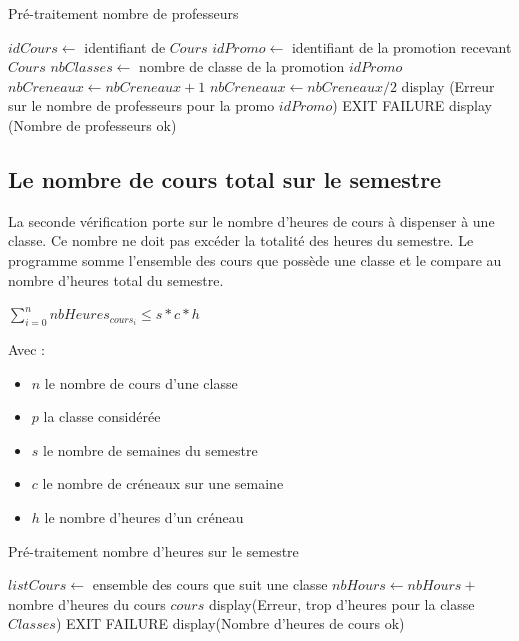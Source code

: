 \documentclass[12pt,a4paper,french]{article}
\begin{document}
\begin{algorithm}
\caption{Pré-traitement nombre de professeurs}
\begin{algorithmic}
\STATE $idCours \leftarrow$ identifiant de $Cours$
\STATE $idPromo \leftarrow$ identifiant de la promotion recevant $Cours$
\STATE $nbClasses \leftarrow$ nombre de classe de la promotion $idPromo$
\STATE $nbCreneaux \leftarrow nbCreneaux + 1$
\ENDIF
\ENDFOR
\ENDIF
\ENDFOR
{}
\STATE $nbCreneaux \leftarrow nbCreneaux / 2$
\ENDIF
{}
\STATE display (Erreur sur le nombre de professeurs pour la promo $idPromo$)
\STATE EXIT FAILURE
\ENDIF
\ENDFOR
\STATE display (Nombre de professeurs ok)
\end{algorithmic}
\end{algorithm}

\subsection{Le nombre de cours total sur le semestre}
La seconde vérification porte sur le nombre d'heures de cours à dispenser à une classe. Ce nombre ne doit pas excéder la totalité des heures du semestre. Le programme somme l'ensemble des cours que possède une classe et le compare au nombre d'heures total du semestre.

\begin{center}
$\sum_{i=0}^n nbHeures_{cours_i} \leq s*c*h$
\end{center}

Avec :
\begin{itemize}
\item $n$ le nombre de cours d'une classe
\item $p$ la classe considérée
\item $s$ le nombre de semaines du semestre
\item $c$ le nombre de créneaux sur une semaine
\item $h$ le nombre d'heures d'un créneau
\end{itemize}

\begin{algorithm}
\caption{Pré-traitement nombre d'heures sur le semestre}
\begin{algorithmic}
\STATE $listCours \leftarrow$ ensemble des cours que suit une classe
\STATE $nbHours \leftarrow nbHours +$ nombre d'heures du cours $cours$
\ENDFOR
{}
\STATE display(Erreur, trop d'heures pour la classe $Classes$)
\STATE EXIT FAILURE
\ENDIF
\ENDFOR
\STATE display(Nombre d'heures de cours ok)
\end{algorithmic}
\end{algorithm}
\end{document}

